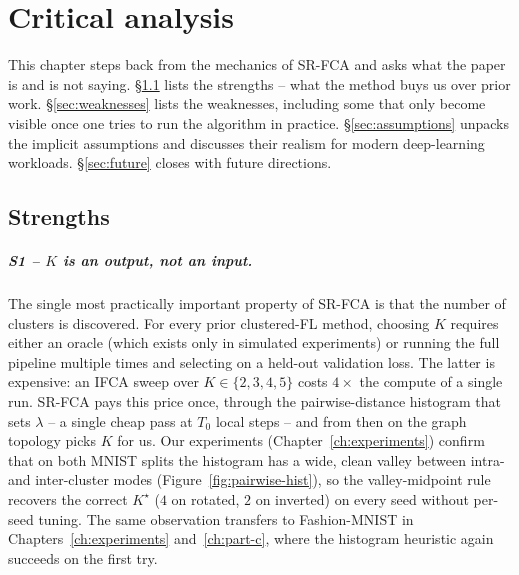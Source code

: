 \chapter{Critical analysis}\label{ch:critical-analysis}

This chapter steps back from the mechanics of SR-FCA and asks what the paper is and is not saying. \S\ref{sec:strengths} lists the strengths -- what the method buys us over prior work. \S\ref{sec:weaknesses} lists the weaknesses, including some that only become visible once one tries to run the algorithm in practice. \S\ref{sec:assumptions} unpacks the implicit assumptions and discusses their realism for modern deep-learning workloads. \S\ref{sec:future} closes with future directions.

\section{Strengths}\label{sec:strengths}

\paragraph{S1 -- $K$ is an output, not an input.} The single most practically important property of SR-FCA is that the number of clusters is discovered. For every prior clustered-FL method, choosing $K$ requires either an oracle (which exists only in simulated experiments) or running the full pipeline multiple times and selecting on a held-out validation loss. The latter is expensive: an IFCA sweep over $K \in \{2, 3, 4, 5\}$ costs $4\times$ the compute of a single run. SR-FCA pays this price once, through the pairwise-distance histogram that sets $\lambda$ -- a single cheap pass at $T_0$ local steps -- and from then on the graph topology picks $K$ for us. Our experiments (Chapter~\ref{ch:experiments}) confirm that on both MNIST splits the histogram has a wide, clean valley between intra- and inter-cluster modes (Figure~\ref{fig:pairwise-hist}), so the valley-midpoint rule recovers the correct $K^\star$ ($4$ on rotated, $2$ on inverted) on every seed without per-seed tuning. The same observation transfers to Fashion-MNIST in Chapters~\ref{ch:experiments} and~\ref{ch:part-c}, where the histogram heuristic again succeeds on the first try.

